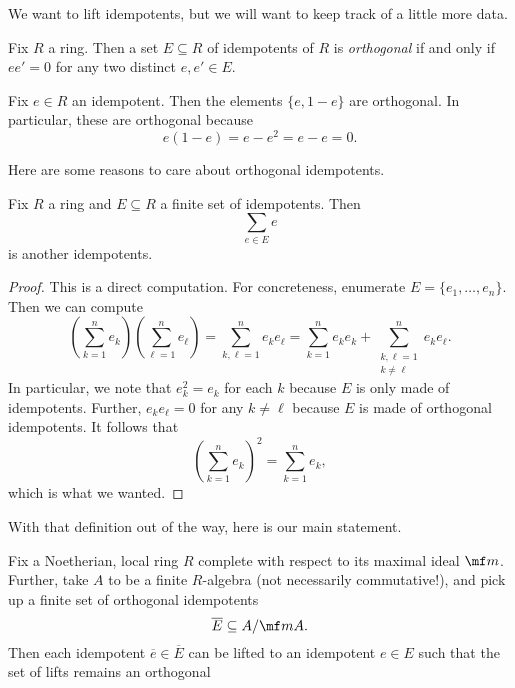 We want to lift idempotents, but we will want to keep track of a little more data.
\begin{definition}
	Fix $R$ a ring. Then a set $E\subseteq R$ of idempotents of $R$ is \textit{orthogonal} if and only if $ee'=0$ for any two distinct $e,e'\in E$.
\end{definition}
\begin{example}
	Fix $e\in R$ an idempotent. Then the elements $\{e,1-e\}$ are orthogonal. In particular, these are orthogonal because
	\[e(1-e)=e-e^2=e-e=0.\]
\end{example}
Here are some reasons to care about orthogonal idempotents.
\begin{lemma}
	Fix $R$ a ring and $E\subseteq R$ a finite set of idempotents. Then
	\[\sum_{e\in E}e\]
	is another idempotents.
\end{lemma}
\begin{proof}
	This is a direct computation. For concreteness, enumerate $E=\{e_1,\ldots,e_n\}$. Then we can compute
	\[\left(\sum_{k=1}^ne_k\right)\left(\sum_{\ell=1}^ne_\ell\right)=\sum_{k,\ell=1}^ne_ke_\ell=\sum_{k=1}^ne_ke_k+\sum_{\substack{k,\ell=1\\k\ne\ell}}^ne_ke_\ell.\]
	In particular, we note that $e_k^2=e_k$ for each $k$ because $E$ is only made of idempotents. Further, $e_ke_\ell=0$ for any $k\ne\ell$ because $E$ is made of orthogonal idempotents. It follows that
	\[\left(\sum_{k=1}^ne_k\right)^2=\sum_{k=1}^ne_k,\]
	which is what we wanted.
\end{proof}
With that definition out of the way, here is our main statement.
\begin{proposition} \label{prop:liftidemp}
	Fix a Noetherian, local ring $R$ complete with respect to its maximal ideal $\mf m$. Further, take $A$ to be a finite $R$-algebra (not necessarily commutative!), and pick up a finite set of orthogonal idempotents
	\[\overline E\subseteq A/\mf mA.\]
	Then each idempotent $\overline e\in\overline E$ can be lifted to an idempotent $e\in E$ such that the set of lifts remains an orthogonal 
\end{proposition}
